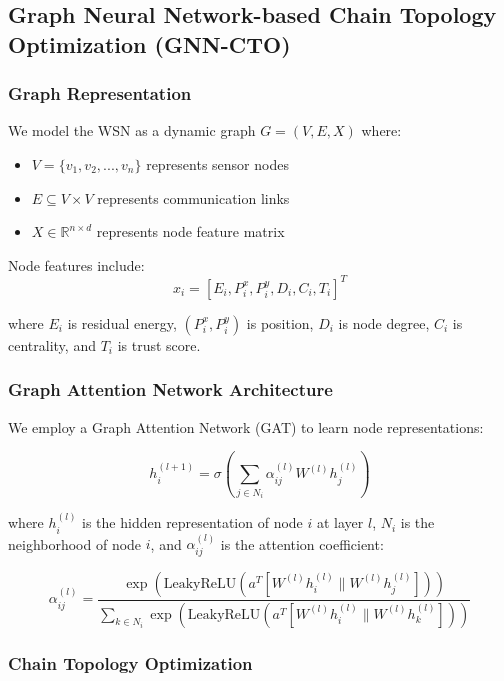 \documentclass[conference]{IEEEtran}
\begin{document}
\subsection{Graph Neural Network-based Chain Topology Optimization (GNN-CTO)}

\subsubsection{Graph Representation}

We model the WSN as a dynamic graph $G = (V, E, X)$ where:
\begin{itemize}
    \item $V = \{v_1, v_2, ..., v_n\}$ represents sensor nodes
    \item $E \subseteq V \times V$ represents communication links
    \item $X \in \mathbb{R}^{n \times d}$ represents node feature matrix
\end{itemize}

Node features include:
\begin{equation}
x_i = [E_i, P_i^x, P_i^y, D_i, C_i, T_i]^T
\end{equation}

where $E_i$ is residual energy, $(P_i^x, P_i^y)$ is position, $D_i$ is node degree, $C_i$ is centrality, and $T_i$ is trust score.

\subsubsection{Graph Attention Network Architecture}

We employ a Graph Attention Network (GAT) to learn node representations:

\begin{equation}
h_i^{(l+1)} = \sigma\left(\sum_{j \in N_i} \alpha_{ij}^{(l)} W^{(l)} h_j^{(l)}\right)
\end{equation}

where $h_i^{(l)}$ is the hidden representation of node $i$ at layer $l$, $N_i$ is the neighborhood of node $i$, and $\alpha_{ij}^{(l)}$ is the attention coefficient:

\begin{equation}
\alpha_{ij}^{(l)} = \frac{\exp(\text{LeakyReLU}(a^T[W^{(l)}h_i^{(l)} \| W^{(l)}h_j^{(l)}]))}{\sum_{k \in N_i} \exp(\text{LeakyReLU}(a^T[W^{(l)}h_i^{(l)} \| W^{(l)}h_k^{(l)}]))}
\end{equation}

\subsubsection{Chain Topology Optimization}
\end{document}
